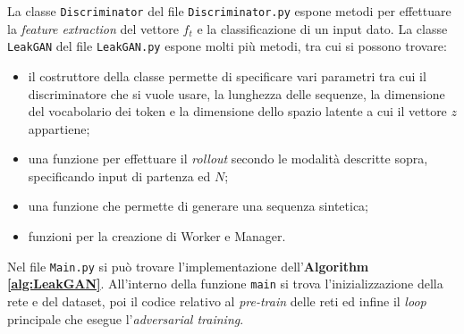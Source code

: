 
La classe \lstinline{Discriminator} del file \lstinline{Discriminator.py} espone metodi per effettuare la \emph{feature extraction} del vettore $f_t$ e la classificazione di un input dato.
La classe \lstinline{LeakGAN} del file \lstinline{LeakGAN.py} espone molti più metodi, tra cui si possono trovare:
\begin{itemize}
  \item il costruttore della classe permette di specificare vari parametri tra cui il discriminatore che si vuole usare, la lunghezza delle sequenze, la dimensione del vocabolario dei token e la dimensione dello spazio latente a cui il vettore $z$ appartiene;
  \item una funzione per effettuare il \emph{rollout} secondo le modalità descritte sopra, specificando input di partenza ed $N$;
  \item una funzione che permette di generare una sequenza sintetica;
  \item funzioni per la creazione di Worker e Manager.
\end{itemize}
Nel file \lstinline{Main.py} si può trovare l'implementazione dell'\textbf{Algorithm \ref{alg:LeakGAN}}.
All'interno della funzione \lstinline{main} si trova l'inizializzazione della rete e del dataset, poi il codice relativo al \emph{pre-train} delle reti ed infine il \emph{loop} principale che esegue l'\emph{adversarial training}.
